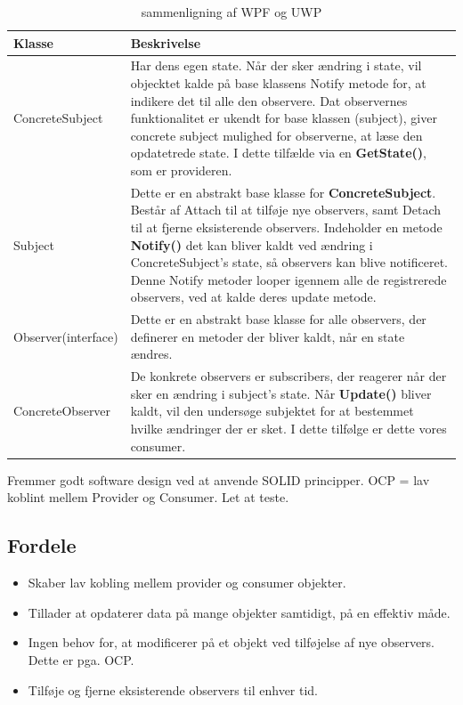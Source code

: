 \documentclass[../report.tex]{subfiles}
\begin{document}
\begin{table}[H]
    \centering
    \begin{tabular}{l|p{}}
        Klasse          & Beskrivelse        \\ \toprule
        ConcreteSubject                & Har dens egen state. Når der sker ændring i state, vil objecktet kalde på base klassens Notify metode for, at indikere det til alle den observere. Dat observernes funktionalitet er ukendt for base klassen (subject), giver concrete subject mulighed for observerne, at læse den opdatetrede state. I dette tilfælde via en \textbf{GetState()}, som er provideren.   \\ \midrule
        Subject         & Dette er en abstrakt base klasse for \textbf{ConcreteSubject}. Består af Attach til at tilføje nye observers, samt Detach til at fjerne eksisterende observers. Indeholder en metode \textbf{Notify()} det kan bliver kaldt ved ændring i ConcreteSubject's state, så observers kan blive notificeret. Denne Notify metoder looper igennem alle de registrerede observers, ved at kalde deres update metode.           \\ \midrule
        Observer(interface)    & Dette er en abstrakt base klasse for alle observers, der definerer en metoder der bliver kaldt, når en state ændres.             \\ \midrule
        ConcreteObserver & De konkrete observers er subscribers, der reagerer når der sker en ændring i subject's state. Når \textbf{Update()} bliver kaldt, vil den undersøge subjektet for at bestemmet hvilke ændringer der er sket. I dette tilfølge er dette vores consumer. \\ \bottomrule
    \end{tabular}
    \caption{sammenligning af WPF og UWP}\label{tab:wpfVSuwp}
\end{table}

Fremmer godt software design ved at anvende SOLID principper. OCP = lav koblint mellem Provider og Consumer. Let at teste.

\subsection*{Fordele}
\begin{itemize}
    \item Skaber lav kobling mellem provider og consumer objekter.
    \item Tillader at opdaterer data på mange objekter samtidigt, på en effektiv måde.
    \item Ingen behov for, at modificerer på et objekt ved tilføjelse af nye observers. Dette er pga. OCP.
    \item Tilføje og fjerne eksisterende observers til enhver tid.
\end{itemize}
\end{document}
